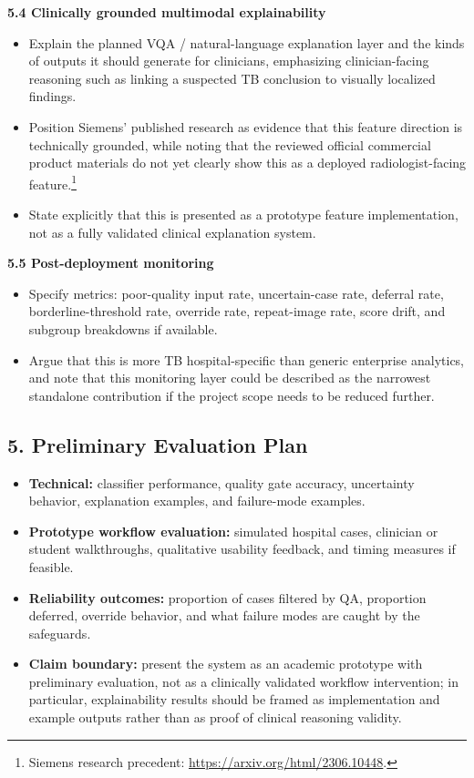 \documentclass[11pt]{article}
\begin{document}
\textbf{5.4 Clinically grounded multimodal explainability}
\begin{itemize}[leftmargin=1.5em]
    \item Explain the planned VQA / natural-language explanation layer and the kinds of outputs it should generate for clinicians, emphasizing clinician-facing reasoning such as linking a suspected TB conclusion to visually localized findings.
    \item Position Siemens' published research as evidence that this feature direction is technically grounded, while noting that the reviewed official commercial product materials do not yet clearly show this as a deployed radiologist-facing feature.\footnote{Siemens research precedent: \url{https://arxiv.org/html/2306.10448}.}
    \item State explicitly that this is presented as a prototype feature implementation, not as a fully validated clinical explanation system.
\end{itemize}

\textbf{5.5 Post-deployment monitoring}
\begin{itemize}[leftmargin=1.5em]
    \item Specify metrics: poor-quality input rate, uncertain-case rate, deferral rate, borderline-threshold rate, override rate, repeat-image rate, score drift, and subgroup breakdowns if available.
    \item Argue that this is more TB hospital-specific than generic enterprise analytics, and note that this monitoring layer could be described as the narrowest standalone contribution if the project scope needs to be reduced further.
\end{itemize}

\subsection{5. Preliminary Evaluation Plan}

\begin{itemize}[leftmargin=1.5em]
    \item \textbf{Technical:} classifier performance, quality gate accuracy, uncertainty behavior, explanation examples, and failure-mode examples.
    \item \textbf{Prototype workflow evaluation:} simulated hospital cases, clinician or student walkthroughs, qualitative usability feedback, and timing measures if feasible.
    \item \textbf{Reliability outcomes:} proportion of cases filtered by QA, proportion deferred, override behavior, and what failure modes are caught by the safeguards.
    \item \textbf{Claim boundary:} present the system as an academic prototype with preliminary evaluation, not as a clinically validated workflow intervention; in particular, explainability results should be framed as implementation and example outputs rather than as proof of clinical reasoning validity.
\end{itemize}
\end{document}
